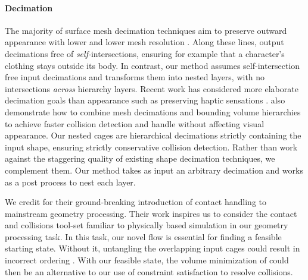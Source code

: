 \paragraph{Decimation}
%
The majority of surface mesh decimation techniques aim to preserve outward
appearance with lower and lower mesh resolution
\cite{Hoppe:1996:PM,Garland:1997:SSU,Melax98}.
%
Along these lines, \cite{gumhold2003intersection} output
decimations free of \emph{self-}intersections, ensuring for example that a
character's clothing stays outside its body.
%
In contrast, our method assumes self-intersection free input decimations and
transforms them into nested layers, with no intersections \emph{across}
hierarchy layers.
%
Recent work has considered more elaborate decimation goals than appearance such
as preserving haptic sensations \cite{Otaduy:2003:SPS}.
%
\cite{Otaduy:2003:CDH} also demonstrate how to combine mesh decimations and bounding
volume hierarchies to achieve faster collision detection and handle without
affecting visual appearance.
%
Our nested cages are hierarchical decimations strictly containing the input
shape, ensuring strictly conservative collision detection.
%
Rather than work against the staggering quality of existing shape decimation
techniques, we complement them. Our method takes as input an arbitrary
decimation and works as a post process to nest each layer.




We credit \cite{ContactAwareModeling:2011} for their
ground-breaking introduction of contact handling to mainstream geometry
processing. Their work inspires us to consider the contact and collisions
tool-set familiar to physically based simulation in our geometry processing
task.
%
In this task, our novel flow is essential for finding a feasible starting
state.
%
Without it, untangling the overlapping input cages could result in incorrect
ordering \cite{Baraff:2003:UC}.
%
%
With our feasible state, the volume minimization of
\cite{ContactAwareModeling:2011} could then be an alternative to our use of
constraint satisfaction to resolve collisions.

